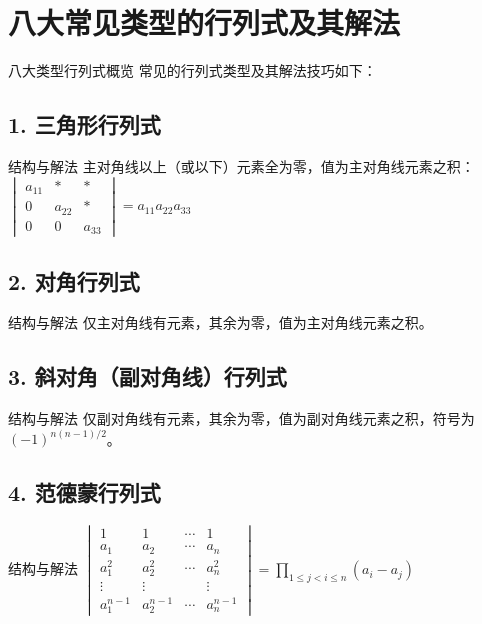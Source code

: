 \documentclass[UTF8]{ctexart}
\theoremstyle{mydef}
\begin{document}
\section{八大常见类型的行列式及其解法}

\begin{mybox}{八大类型行列式概览}
常见的行列式类型及其解法技巧如下：
\end{mybox}

\subsection{1. 三角形行列式}
\begin{mybox}{结构与解法}
主对角线以上（或以下）元素全为零，值为主对角线元素之积：
\(
\begin{vmatrix}
 a_{11} & * & * \\
 0 & a_{22} & * \\
 0 & 0 & a_{33}
\end{vmatrix} = a_{11} a_{22} a_{33}
\)
\end{mybox}

\subsection{2. 对角行列式}
\begin{mybox}{结构与解法}
仅主对角线有元素，其余为零，值为主对角线元素之积。
\end{mybox}

\subsection{3. 斜对角（副对角线）行列式}
\begin{mybox}{结构与解法}
仅副对角线有元素，其余为零，值为副对角线元素之积，符号为 $(-1)^{n(n-1)/2}$。
\end{mybox}

\subsection{4. 范德蒙行列式}
\begin{mybox}{结构与解法}
\(
\begin{vmatrix}
1 & 1 & \cdots & 1 \\
 a_1 & a_2 & \cdots & a_n \\
 a_1^2 & a_2^2 & \cdots & a_n^2 \\
 \vdots & \vdots & & \vdots \\
 a_1^{n-1} & a_2^{n-1} & \cdots & a_n^{n-1}
\end{vmatrix} = \prod_{1 \leq j < i \leq n} (a_i - a_j)
\)
\end{mybox}
\end{document}
